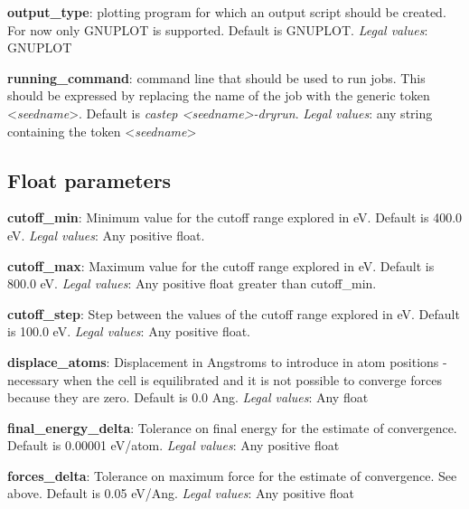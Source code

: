 \documentclass[10pt]{article}
\begin{document}
\textbf{output\_type}: plotting program for which an output script should be created. For now only GNUPLOT is supported. Default is GNUPLOT.\newline
\textit{Legal values}: GNUPLOT\newline

\textbf{running\_command}: command line that should be used to run jobs. This should be expressed by replacing the name of the job with the generic token \textless \textit{seedname}\textgreater. Default is \textit{castep \textless seedname\textgreater -dryrun}.\newline
\textit{Legal values}: any string containing the token \textless \textit{seedname}\textgreater\newline

\subsection{Float parameters}

\textbf{cutoff\_min}: Minimum value for the cutoff range explored in eV. Default is 400.0 eV.\newline
\textit{Legal values}: Any positive float.\newline

\textbf{cutoff\_max}: Maximum value for the cutoff range explored in eV. Default is 800.0 eV.\newline
\textit{Legal values}: Any positive float greater than cutoff\_min.\newline

\textbf{cutoff\_step}: Step between the values of the cutoff range explored in eV. Default is 100.0 eV.\newline
\textit{Legal values}: Any positive float.\newline

\textbf{displace\_atoms}: Displacement in Angstroms to introduce in atom positions - necessary when the cell is equilibrated and it is not possible to converge forces because they are zero. Default is 0.0 Ang.\newline
\textit{Legal values}: Any float\newline

\textbf{final\_energy\_delta}: Tolerance on final energy for the estimate of convergence. Default is 0.00001 eV/atom.\newline
\textit{Legal values}: Any positive float\newline

\textbf{forces\_delta}: Tolerance on maximum force for the estimate of convergence. See above. Default is 0.05 eV/Ang.\newline
\textit{Legal values}: Any positive float\newline
\end{document}
